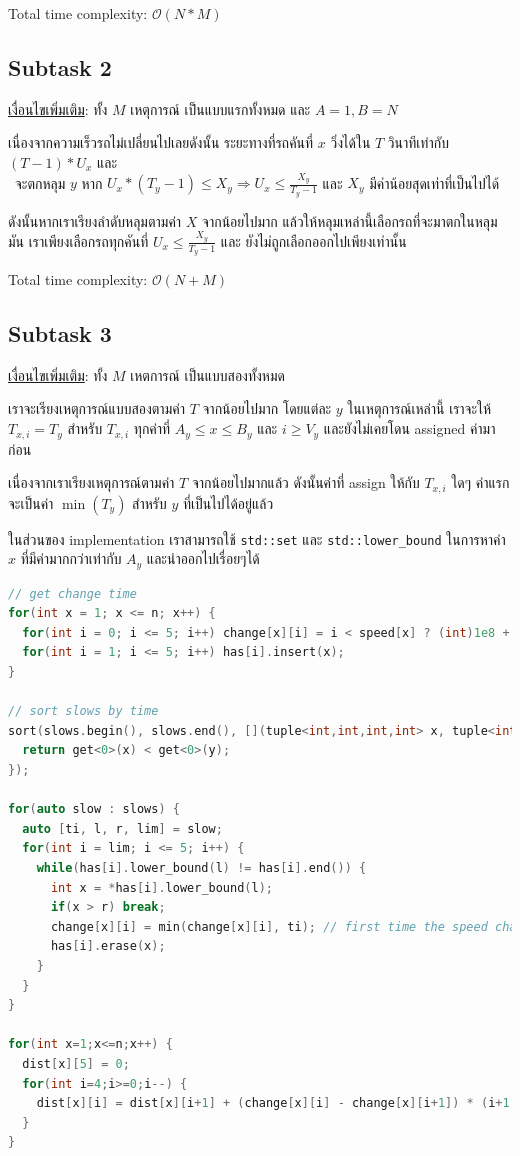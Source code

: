 \documentclass[12pt]{article}
\newcommand{\code}[1]{\texttt{\scriptsize{#1}}}
\begin{document}
Total time complexity: $\mathcal{O}(N * M)$

\subsection{Subtask 2}

\underline{เงื่อนไขเพิ่มเติม}: ทั้ง $M$ เหตุการณ์ เป็นแบบแรกทั้งหมด และ $A = 1, B = N$

เนื่องจากความเร็วรถไม่เปลี่ยนไปเลยดังนั้น ระยะทางที่รถคันที่ $x$ วิ่งได้ใน $T$ วินาทีเท่ากับ $(T - 1) * U_x$ และ \\\ จะตกหลุม $y$ หาก $U_x * (T_y - 1) \leq X_y \Longrightarrow U_x \leq \frac{X_y}{T_y -  1}$ และ $X_y$ มีค่าน้อยสุดเท่าที่เป็นไปได้

ดังนั้นหากเราเรียงลำดับหลุมตามค่า $X$ จากน้อยไปมาก แล้วให้หลุมเหล่านี้เลือกรถที่จะมาตกในหลุมมัน เราเพียงเลือกรถทุกคันที่ $U_x \leq \frac{X_y}{T_y -  1}$ และ ยังไม่ถูกเลือกออกไปเพียงเท่านั้น

Total time complexity: $\mathcal{O}(N + M)$ 

\subsection{Subtask 3}

\underline{เงื่อนไขเพิ่มเติม}: ทั้ง $M$ เหตการณ์ เป็นแบบสองทั้งหมด

เราจะเรียงเหตุการณ์แบบสองตามค่า $T$ จากน้อยไปมาก โดยแต่ละ $y$ ในเหตุการณ์เหล่านี้ เราจะให้ $T_{x,i} = T_y$ สำหรับ $T_{x,i}$ ทุกค่าที่ $A_y \leq x \leq B_y$ และ $i \geq V_y$ และยังไม่เคยโดน assigned ค่ามาก่อน 

เนื่องจากเราเรียงเหตุการณ์ตามค่า $T$ จากน้อยไปมากแล้ว ดังนั้นค่าที่ assign ให้กับ $T_{x,i}$ ใดๆ ค่าแรกจะเป็นค่า $\min(T_y)$ สำหรับ $y$ ที่เป็นไปได้อยู่แล้ว

ในส่วนของ implementation เราสามารถใช้ \code{std::set} และ \code{std::lower\_bound} ในการหาค่า $x$ ที่มีค่ามากกว่าเท่ากับ $A_y$ และนำออกไปเรื่อยๆได้

\begin{lstlisting}[language=C++]
// get change time
for(int x = 1; x <= n; x++) {
  for(int i = 0; i <= 5; i++) change[x][i] = i < speed[x] ? (int)1e8 + 1 : 1;
  for(int i = 1; i <= 5; i++) has[i].insert(x);
}

// sort slows by time
sort(slows.begin(), slows.end(), [](tuple<int,int,int,int> x, tuple<int,int,int,int> y) {
  return get<0>(x) < get<0>(y);
});

for(auto slow : slows) {
  auto [ti, l, r, lim] = slow;
  for(int i = lim; i <= 5; i++) {
    while(has[i].lower_bound(l) != has[i].end()) {
      int x = *has[i].lower_bound(l);
      if(x > r) break;
      change[x][i] = min(change[x][i], ti); // first time the speed changes to `i`
      has[i].erase(x);
    }
  }
}

for(int x=1;x<=n;x++) {
  dist[x][5] = 0;
  for(int i=4;i>=0;i--) {
    dist[x][i] = dist[x][i+1] + (change[x][i] - change[x][i+1]) * (i+1);
  }
}
\end{lstlisting}
\end{document}
